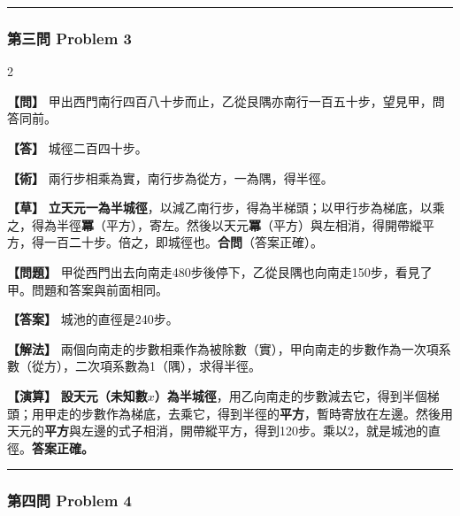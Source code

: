 \documentclass[11pt,a4paper]{article}
\newcommand{\wen}[1]{\par\noindent\textbf{\color{problemcolor}【問】} #1\par}
\newcommand{\da}[1]{\par\noindent\textbf{\color{problemcolor}【答】} #1\par}
\newcommand{\shu}[1]{\par\noindent\textbf{\color{problemcolor}【術】} #1\par}
\newcommand{\cao}[1]{\par\noindent\textbf{\color{problemcolor}【草】} #1\par}
\newcommand{\wenm}[1]{\par\noindent\textbf{\color{problemcolor}【問題】} #1\par}
\newcommand{\dam}[1]{\par\noindent\textbf{\color{problemcolor}【答案】} #1\par}
\newcommand{\shum}[1]{\par\noindent\textbf{\color{problemcolor}【解法】} #1\par}
\newcommand{\caom}[1]{\par\noindent\textbf{\color{problemcolor}【演算】} #1\par}
\begin{document}
\vspace{0.5cm}
\noindent\textcolor{rulecolor}{\rule{\textwidth}{0.4pt}}

\subsubsection*{第三問 \quad Problem 3}

\begin{paracol}{2}
\wen{甲出西門南行四百八十步而止，乙從艮隅亦南行一百五十步，望見甲，問答同前。}

\da{城徑二百四十步。}

\shu{兩行步相乘為實，南行步為從方，一為隅，得半徑。}

\cao{\textbf{立天元一為半城徑}，以減乙南行步，得為半梯頭；以甲行步為梯底，以乘之，得為半徑\textbf{冪}（平方），寄左。然後以天元\textbf{冪}（平方）與左相消，得開帶縱平方，得一百二十步。倍之，即城徑也。\textbf{合問}（答案正確）。}

\switchcolumn
\wenm{甲從西門出去向南走480步後停下，乙從艮隅也向南走150步，看見了甲。問題和答案與前面相同。}

\dam{城池的直徑是240步。}

\shum{兩個向南走的步數相乘作為被除數（實），甲向南走的步數作為一次項系數（從方），二次項系數為1（隅），求得半徑。}

\caom{\textbf{設天元（未知數$x$）為半城徑}，用乙向南走的步數減去它，得到半個梯頭；用甲走的步數作為梯底，去乘它，得到半徑的\textbf{平方}，暫時寄放在左邊。然後用天元的\textbf{平方}與左邊的式子相消，開帶縱平方，得到120步。乘以2，就是城池的直徑。\textbf{答案正確。}}
\end{paracol}

\vspace{0.5cm}
\noindent\textcolor{rulecolor}{\rule{\textwidth}{0.4pt}}

\subsubsection*{第四問 \quad Problem 4}
\end{document}
